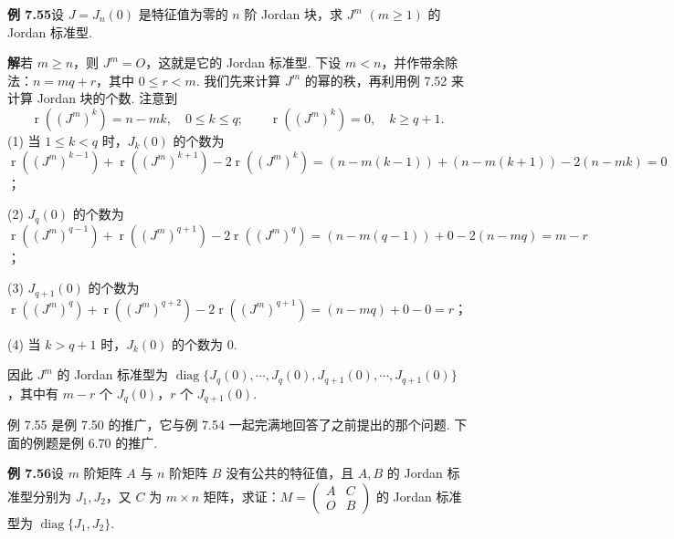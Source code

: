 \documentclass[UTF8, 12pt, fontset=fandol, oneside]{ctexart}
\begin{document}
\noindent\textbf{例 7.55}\quad 设 $J=J_n(0)$ 是特征值为零的 $n$ 阶 Jordan 块，求 $J^m$ $(m\ge 1)$ 的 Jordan 标准型.

\noindent\textbf{解}\quad 若 $m\ge n$，则 $J^m=O$，这就是它的 Jordan 标准型. 下设 $m<n$，并作带余除法：$n=mq+r$，其中 $0\le r<m$. 我们先来计算 $J^m$ 的幂的秩，再利用例 7.52 来计算 Jordan 块的个数. 注意到
\[
\operatorname{r}((J^m)^k)=n-mk,\quad 0\le k\le q;\qquad
\operatorname{r}((J^m)^k)=0,\quad k\ge q+1.
\]
(1) 当 $1\le k<q$ 时，$J_k(0)$ 的个数为 $\operatorname{r}((J^m)^{k-1})+\operatorname{r}((J^m)^{k+1})-2\operatorname{r}((J^m)^k)=(n-m(k-1))+(n-m(k+1))-2(n-mk)=0$；

(2) $J_q(0)$ 的个数为 $\operatorname{r}((J^m)^{q-1})+\operatorname{r}((J^m)^{q+1})-2\operatorname{r}((J^m)^q)=(n-m(q-1))+0-2(n-mq)=m-r$；

(3) $J_{q+1}(0)$ 的个数为 $\operatorname{r}((J^m)^q)+\operatorname{r}((J^m)^{q+2})-2\operatorname{r}((J^m)^{q+1})=(n-mq)+0-0=r$；

(4) 当 $k>q+1$ 时，$J_k(0)$ 的个数为 0.

因此 $J^m$ 的 Jordan 标准型为 $\operatorname{diag}\{J_q(0),\cdots,J_q(0),J_{q+1}(0),\cdots,J_{q+1}(0)\}$，其中有 $m-r$ 个 $J_q(0)$，$r$ 个 $J_{q+1}(0)$.

例 7.55 是例 7.50 的推广，它与例 7.54 一起完满地回答了之前提出的那个问题. 下面的例题是例 6.70 的推广.

\noindent\textbf{例 7.56}\quad 设 $m$ 阶矩阵 $A$ 与 $n$ 阶矩阵 $B$ 没有公共的特征值，且 $A,B$ 的 Jordan 标准型分别为 $J_1,J_2$，又 $C$ 为 $m\times n$ 矩阵，求证：$M=\left(\begin{array}{cc}A&C\\O&B\end{array}\right)$ 的 Jordan 标准型为 $\operatorname{diag}\{J_1,J_2\}$.
\end{document}
